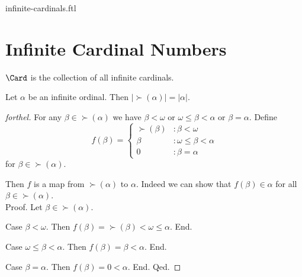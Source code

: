 \documentclass{naproche-library}
\begin{document}
\begin{smodule}{infinite-cardinals.ftl}

  
  \begin{forthel}
  \end{forthel}

  \section*{Infinite Cardinal Numbers}

  \begin{definition}[forthel,id=SET_THEORY_07_4231078585827328,printid]
    $\Card$ is the collection of all infinite cardinals.
  \end{definition}

  \begin{proposition}[forthel,id=SET_THEORY_07_8189062544359424,printid]
    Let $\alpha$ be an infinite ordinal.
    Then $|\succ(\alpha)| = |\alpha|$.
  \end{proposition}
  \begin{proof}[forthel]
    For any $\beta \in \succ(\alpha)$ we have
    $\beta < \omega$ or $\omega \leq \beta < \alpha$ or $\beta = \alpha$.
    Define \[ f(\beta) =
      \begin{cases}
        \succ(\beta)  & : \beta < \omega
        \\
        \beta         & : \omega \leq \beta < \alpha
        \\
        0             & : \beta = \alpha
      \end{cases} \]
    for $\beta \in \succ(\alpha)$.

    Then $f$ is a map from $\succ(\alpha)$ to $\alpha$.
    Indeed we can show that $f(\beta) \in \alpha$ for all
    $\beta \in \succ(\alpha)$. \\
    Proof.
      Let $\beta \in \succ(\alpha)$.

      Case $\beta < \omega$.
        Then $f(\beta)
          = \succ(\beta)
          < \omega
          \leq \alpha$.
      End.

      Case $\omega \leq \beta < \alpha$.
        Then $f(\beta)
          = \beta
          < \alpha$.
      End.

      Case $\beta = \alpha$.
        Then $f(\beta)
          = 0
          < \alpha$.
      End.
    Qed.


\end{proof}
\end{smodule}
\end{document}
